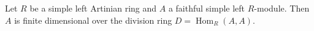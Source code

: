 Let $R$ be a simple left Artinian ring and $A$ a faithful simple left $R$-module. Then $A$ is finite dimensional over the division ring $D = \operatorname{Hom}_R(A,A)$.
